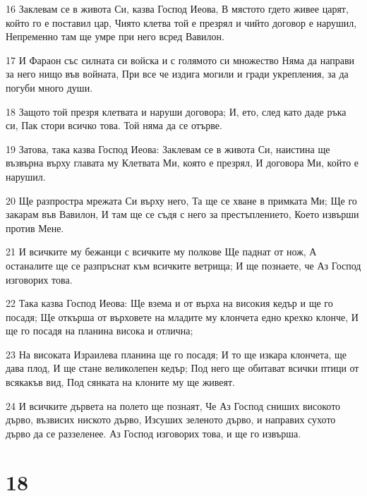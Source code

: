 \par 16 Заклевам се в живота Си, казва Господ Иеова, В мястото гдето живее царят, който го е поставил цар, Чиято клетва той е презрял и чийто договор е нарушил, Непременно там ще умре при него всред Вавилон.
\par 17 И Фараон със силната си войска и с голямото си множество Няма да направи за него нищо във войната, При все че издига могили и гради укрепления, за да погуби много души.
\par 18 Защото той презря клетвата и наруши договора; И, ето, след като даде ръка си, Пак стори всичко това. Той няма да се отърве.
\par 19 Затова, така казва Господ Иеова: Заклевам се в живота Си, наистина ще възвърна върху главата му Клетвата Ми, която е презрял, И договора Ми, който е нарушил.
\par 20 Ще разпростра мрежата Си върху него, Та ще се хване в примката Ми; Ще го закарам във Вавилон, И там ще се съдя с него за престъплението, Което извърши против Мене.
\par 21 И всичките му бежанци с всичките му полкове Ще паднат от нож, А останалите ще се разпръснат към всичките ветрища; И ще познаете, че Аз Господ изговорих това.
\par 22 Така казва Господ Иеова: Ще взема и от върха на високия кедър и ще го посадя; Ще откърша от върховете на младите му клончета едно крехко клонче, И ще го посадя на планина висока и отлична;
\par 23 На високата Израилева планина ще го посадя; И то ще изкара клончета, ще дава плод, И ще стане великолепен кедър; Под него ще обитават всички птици от всякакъв вид, Под сянката на клоните му ще живеят.
\par 24 И всичките дървета на полето ще познаят, Че Аз Господ сниших високото дърво, възвисих ниското дърво, Изсуших зеленото дърво, и направих сухото дърво да се раззеленее. Аз Господ изговорих това, и ще го извърша.

\chapter{18}

